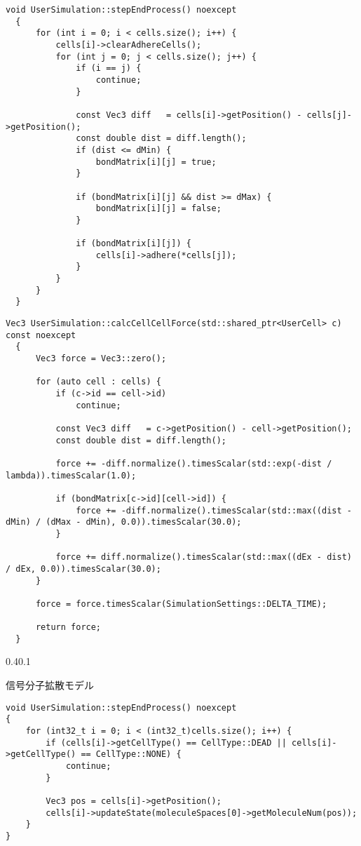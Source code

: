 \documentclass[vipdfmx,a4paper,11pt]{jsarticle}
\makeatletter
\renewcommand{\subsection}{%
  \@startsection{subsection}{1}{\z@}%
  {0.4\Cvs}{0.1\Cvs}%
  {\normalfont\large\headfont\raggedright}}
\makeatother
\begin{document}
\begin{lstlisting}[caption=stepEndProcess()]
  void UserSimulation::stepEndProcess() noexcept
  {
      for (int i = 0; i < cells.size(); i++) {
          cells[i]->clearAdhereCells();
          for (int j = 0; j < cells.size(); j++) {
              if (i == j) {
                  continue;
              }

              const Vec3 diff   = cells[i]->getPosition() - cells[j]->getPosition();
              const double dist = diff.length();
              if (dist <= dMin) {
                  bondMatrix[i][j] = true;
              }

              if (bondMatrix[i][j] && dist >= dMax) {
                  bondMatrix[i][j] = false;
              }

              if (bondMatrix[i][j]) {
                  cells[i]->adhere(*cells[j]);
              }
          }
      }
  }
\end{lstlisting}

\begin{lstlisting}[caption=calcCellCellForce()]
  Vec3 UserSimulation::calcCellCellForce(std::shared_ptr<UserCell> c) const noexcept
  {
      Vec3 force = Vec3::zero();
  
      for (auto cell : cells) {
          if (c->id == cell->id)
              continue;
  
          const Vec3 diff   = c->getPosition() - cell->getPosition();
          const double dist = diff.length();
  
          force += -diff.normalize().timesScalar(std::exp(-dist / lambda)).timesScalar(1.0);
  
          if (bondMatrix[c->id][cell->id]) {
              force += -diff.normalize().timesScalar(std::max((dist - dMin) / (dMax - dMin), 0.0)).timesScalar(30.0);
          }
  
          force += diff.normalize().timesScalar(std::max((dEx - dist) / dEx, 0.0)).timesScalar(30.0);
      }
  
      force = force.timesScalar(SimulationSettings::DELTA_TIME);
  
      return force;
  }
\end{lstlisting}

\subsection{信号分子拡散モデル}
\begin{lstlisting}[caption=stepEndProcess()]
void UserSimulation::stepEndProcess() noexcept
{
    for (int32_t i = 0; i < (int32_t)cells.size(); i++) {
        if (cells[i]->getCellType() == CellType::DEAD || cells[i]->getCellType() == CellType::NONE) {
            continue;
        }

        Vec3 pos = cells[i]->getPosition();
        cells[i]->updateState(moleculeSpaces[0]->getMoleculeNum(pos));
    }
}
\end{lstlisting}
\end{document}
